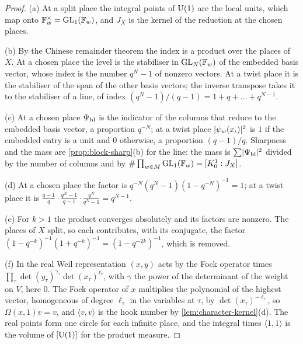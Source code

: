 \begin{proof}
(a) At a split place the integral points of $\operatorname{U}(1)$ are the local units, which map onto $\mathbb{F}_w^\times=\operatorname{GL}_1(\mathbb{F}_w)$, and $J_X$ is the kernel of the reduction at the chosen places.

(b) By the Chinese remainder theorem the index is a product over the places of $X$. At a chosen place the level is the stabiliser in $\operatorname{GL}_N(\mathbb{F}_w)$ of the embedded basis vector, whose index is the number $q^N-1$ of nonzero
vectors. At a twist place it is the stabiliser of the span of the other basis vectors; the inverse transpose takes it to the stabiliser of a line, of index $(q^N-1)/(q-1)=1+q+\dots+q^{N-1}$.

(c) At a chosen place $\Psi_{\rm bl}$ is the indicator of the columns that reduce to the embedded basis vector, a proportion $q^{-N}$; at a twist place $\lvert \psi_w(x_\iota)\rvert^2$ is $1$ if the embedded entry is a unit and $0$ otherwise,
a proportion $(q-1)/q$. Sharpness and the mass are \cref{prop:block-sharp}(b) for the line: the mass is $\sum\lvert \Psi_{\rm bl}\rvert^2$ divided by the number of columns and by $\#\prod_{w\in M}\operatorname{GL}_1(\mathbb{F}_w)=[K_0^1:J_X]$.

(d) At a chosen place the factor is $q^{-N}(q^N-1)(1-q^{-N})^{-1}=1$; at a twist place it is $\frac{q-1}q\cdot\frac{q^N-1}{q-1}\cdot\frac{q^N}{q^N-1}=q^{N-1}$.

(e) For $k>1$ the product converges absolutely and its factors are nonzero. The places of $X$ split, so each contributes, with its conjugate, the factor $(1-q^{-k})^{-1}(1+q^{-k})^{-1}=(1-q^{-2k})^{-1}$, which is removed.

(f) In the real Weil representation $(x,y)$ acts by the Fock operator times $\prod_\tau\det(y_\tau)^{\gamma_\tau}\det(x_\tau)^{\ell_\tau}$, with $\gamma$ the power of the determinant of the weight on $V$, here $0$. The Fock operator of $x$ multiplies the
polynomial of the highest vector, homogeneous of degree $\ell_\tau$ in the variables at $\tau$, by $\det(x_\tau)^{-\ell_\tau}$, so $\Omega(x,1)v=v$, and $\langle v,v\rangle$ is the hook number by \cref{lem:character-kernel}(d). The real points form one
circle for each infinite place, and the integral times $\langle1,1\rangle$ is the volume of $[\operatorname{U}(1)]$ for the product measure.
\end{proof}

